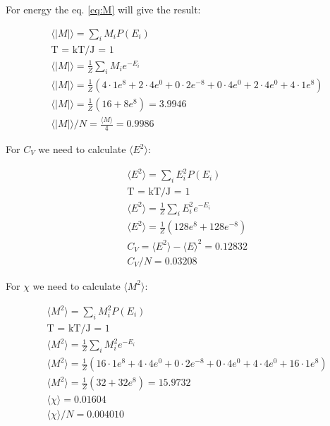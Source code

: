 For energy the eq. \ref{eq:M} will give the result:

\begin{align*}
    &\langle |M| \rangle = \sum_i M_iP(E_i)
    \\
    &\text{T = kT/J = 1} 
    \\
    &\langle |M| \rangle = \frac{1}{Z} \sum_i M_i e^{-E_i}
    \\
    &\langle |M| \rangle 
    = 
    \frac{1}{Z} 
    \left(
      4\cdot1e^{8} 
    + 2\cdot4e^{0} 
    + 0\cdot2e^{-8} 
    + 0\cdot4e^{0} 
    + 2\cdot4e^{0}  
    + 4\cdot1e^{8}
    \right) 
    \\
    &\langle |M| \rangle 
    = 
    \frac{1}{Z} 
    \left(
    16
    + 8 e^{8}
    \right) = 3.9946
    \\ 
    &\langle |M| \rangle /N= \frac{\langle M \rangle}{4} = 0.9986
\end{align*}


\pagebreak
For $C_V$ we need to calculate $\langle E^2 \rangle$:

\begin{align*}
    &\langle E^2 \rangle = \sum_i E^2_iP(E_i)
    \\
    &\text{T = kT/J = 1} 
    \\
    &\langle E^2 \rangle = \frac{1}{Z} \sum_i E_i^2 e^{-E_i}
    \\
    &\langle E^2 \rangle = \frac{1}{Z} \left( 128 e^8 + 128 e^{-8} \right)
    \\
    &C_V = \langle E^2 \rangle - \langle E \rangle^2 = 0.12832
    \\ 
    &C_V/N = 0.03208
\end{align*}



For $\chi$ we need to calculate $\langle M^2 \rangle$:

\begin{align*}
    &\langle M^2 \rangle = \sum_i M_i^2P(E_i)
    \\
    &\text{T = kT/J = 1} 
    \\
    &\langle M^2 \rangle = \frac{1}{Z} \sum_i M_i^2 e^{-E_i}
    \\
    &\langle M^2 \rangle 
    = 
    \frac{1}{Z} 
    \left(
      16\cdot1e^{8} 
    + 4\cdot4e^{0} 
    + 0\cdot2e^{-8} 
    + 0\cdot4e^{0} 
    + 4\cdot4e^{0}  
    + 16\cdot1e^{8}
    \right) 
    \\
    &\langle M^2 \rangle 
    = 
    \frac{1}{Z} 
    \left(
    32
    + 32 e^{8}
    \right) = 15.9732
    \\
    &\langle \chi \rangle = 0.01604
    \\
    &\langle \chi \rangle / N = 0.004010
\end{align*}

